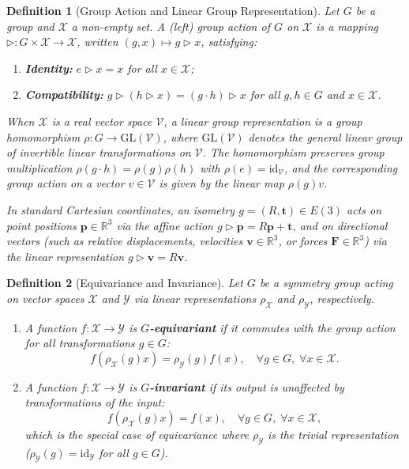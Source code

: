 \documentclass[10pt]{article}
\newtheorem{definition}{Definition}
\begin{document}
\begin{definition}[Group Action and Linear Group Representation]
\label{def:group_action}
Let $G$ be a group and $\mathcal{X}$ a non-empty set. A (left) \emph{group action} of $G$ on $\mathcal{X}$ is a mapping $\triangleright: G \times \mathcal{X} \to \mathcal{X}$, written $(g, x) \mapsto g \triangleright x$, satisfying:
\begin{enumerate}
    \item \textbf{Identity:} $e \triangleright x = x$ for all $x \in \mathcal{X}$;
    \item \textbf{Compatibility:} $g \triangleright (h \triangleright x) = (g \cdot h) \triangleright x$ for all $g, h \in G$ and $x \in \mathcal{X}$.
\end{enumerate}
When $\mathcal{X}$ is a real vector space $\mathcal{V}$, a \emph{linear group representation} is a group homomorphism $\rho: G \to \mathrm{GL}(\mathcal{V})$, where $\mathrm{GL}(\mathcal{V})$ denotes the general linear group of invertible linear transformations on $\mathcal{V}$. The homomorphism preserves group multiplication $\rho(g \cdot h) = \rho(g)\rho(h)$ with $\rho(e) = \mathrm{id}_{\mathcal{V}}$, and the corresponding group action on a vector $v \in \mathcal{V}$ is given by the linear map $\rho(g)v$.

In standard Cartesian coordinates, an isometry $g = (R, \mathbf{t}) \in E(3)$ acts on point positions $\mathbf{p} \in \mathbb{R}^3$ via the affine action $g \triangleright \mathbf{p} = R\mathbf{p} + \mathbf{t}$, and on directional vectors (such as relative displacements, velocities $\mathbf{v} \in \mathbb{R}^3$, or forces $\mathbf{F} \in \mathbb{R}^3$) via the linear representation $g \triangleright \mathbf{v} = R\mathbf{v}$.
\end{definition}

\begin{definition}[Equivariance and Invariance]
\label{def:equivariance}
Let $G$ be a symmetry group acting on vector spaces $\mathcal{X}$ and $\mathcal{Y}$ via linear representations $\rho_{\mathcal{X}}$ and $\rho_{\mathcal{Y}}$, respectively.
\begin{enumerate}
    \item A function $f: \mathcal{X} \to \mathcal{Y}$ is \textbf{$G$-equivariant} if it commutes with the group action for all transformations $g \in G$:
    \begin{equation}
        f(\rho_{\mathcal{X}}(g) x) = \rho_{\mathcal{Y}}(g) f(x), \quad \forall g \in G, \; \forall x \in \mathcal{X}.
    \end{equation}
    \item A function $f: \mathcal{X} \to \mathcal{Y}$ is \textbf{$G$-invariant} if its output is unaffected by transformations of the input:
    \begin{equation}
        f(\rho_{\mathcal{X}}(g) x) = f(x), \quad \forall g \in G, \; \forall x \in \mathcal{X},
    \end{equation}
    which is the special case of equivariance where $\rho_{\mathcal{Y}}$ is the trivial representation ($\rho_{\mathcal{Y}}(g) = \mathrm{id}_{\mathcal{Y}}$ for all $g \in G$).
\end{enumerate}
\end{definition}
\end{document}
